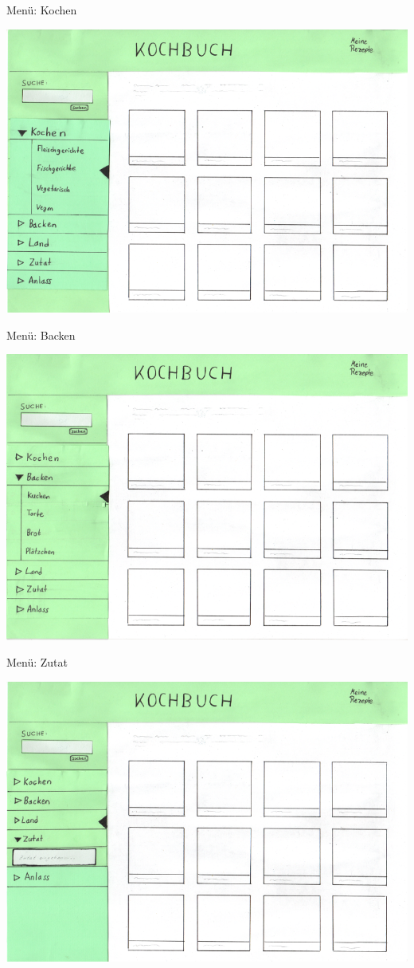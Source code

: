 \documentclass[parskip,10pt,abstracton]{scrartcl}
\begin{document}
Menü: Kochen
\begin{center}
\includegraphics[scale=0.4]{Prototyp/menu_kochen.png}
\end{center}

Menü: Backen
\begin{center}
\includegraphics[scale=0.4]{Prototyp/menu_backen.png}
\end{center}
\newpage
Menü: Zutat
\begin{center}
\includegraphics[scale=0.4]{Prototyp/menu_zutat.png}
\end{center}
\end{document}
